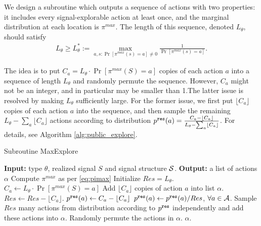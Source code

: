 We design a subroutine  which outputs a sequence of actions with two properties: it includes every signal-explorable action at least once, and the marginal distribution at each location is $\pi^{max}$. The length of this sequence, denoted $L_{\theta}$, should satisfy
\begin{align}\label{eq:public-L}
L_{\theta} \geq L_{\theta}^*:= \max_{a,s: \Pr[\pi^{max}(s)=a] \neq 0} \frac{1}{\Pr[\pi^{max}(s)=a]}.
\end{align}

The idea is to put $C_a = L_{\theta} \cdot \Pr[\pi^{max}(S) = a]$ copies of each action $a$ into a sequence of length $L_{\theta}$ and randomly permute the sequence. However, $C_a$ might not be an integer, and in particular may be smaller than 1.The latter issue is resolved by making $L_{\theta}$ sufficiently large. For the former issue, we first put $\lfloor C_a \rfloor$ copies of each action $a$ into the sequence, and then sample the remaining
    $L_\theta - \sum_a \lfloor C_a \rfloor$
actions according to distribution
    $\pRes(a) = \frac{C_a - \lfloor C_a \rfloor}{L_\theta - \sum_a \lfloor C_a \rfloor}$.
For details, see Algorithm \ref{alg:public_explore}.
 \begin{algorithm}[H]
    \caption{Subroutine MaxExplore}
    	\label{alg:public_explore}
    \begin{algorithmic}[1]
	\STATE \textbf{Input:} type $\theta$, realized signal $S$ and signal structure $\S$.
	\STATE \textbf{Output:} a list of actions $\alpha$
	\STATE Compute $\pi^{max}$ as per \eqref{eq:pimax}
		\STATE Initialize $Res = L_{\theta}$.
							\STATE $C_a \leftarrow  L_{\theta} \cdot \Pr[\pi^{max}(S) = a]$
                     		\STATE Add $\lfloor C_a \rfloor$ copies of action $a$ into list $\alpha$.
			\STATE $Res \leftarrow Res -\lfloor C_a \rfloor $.
			\STATE $\pRes(a)\leftarrow  C_a -  \lfloor C_a\rfloor$
		\ENDFOR
		\STATE $\pRes(a) \leftarrow \pRes(a) / Res$, $\forall a \in \A$.
		\STATE Sample $Res$ many actions from distribution according to $\pRes$ independently and add these actions into $\alpha$.
		\STATE Randomly permute the actions in $\alpha$.
	\RETURN $\alpha$.	
     \end{algorithmic}
\end{algorithm}

